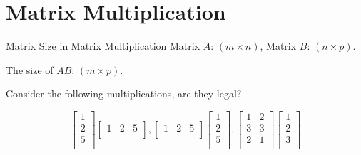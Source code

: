\documentclass{beamer}
\begin{document}
\section{Matrix Multiplication}
\begin{frame}{Matrix Size in Matrix Multiplication}
Matrix $A$: $(m \times n)$, Matrix $B$: $(n \times p)$.

\vspace{3pt}
The size of $AB$: $(m \times p)$.

\vspace{3pt}
Consider the following multiplications, are they legal?

\begin{equation*}
    \left[ \begin{array}{c}
        1\\
        2\\
        5\\
    \end{array} \right] \left[ \begin{matrix}
        1&		2&		5\\
    \end{matrix} \right] , \left[ \begin{matrix}
        1&		2&		5\\
    \end{matrix} \right] \left[ \begin{array}{c}
        1\\
        2\\
        5\\
    \end{array} \right] , \left[ \begin{matrix}
        1&		2\\
        3&		3\\
        2&		1\\
    \end{matrix} \right] \left[ \begin{array}{c}
        1\\
        2\\
        3\\
    \end{array} \right]
\end{equation*}


\end{frame}
\end{document}

